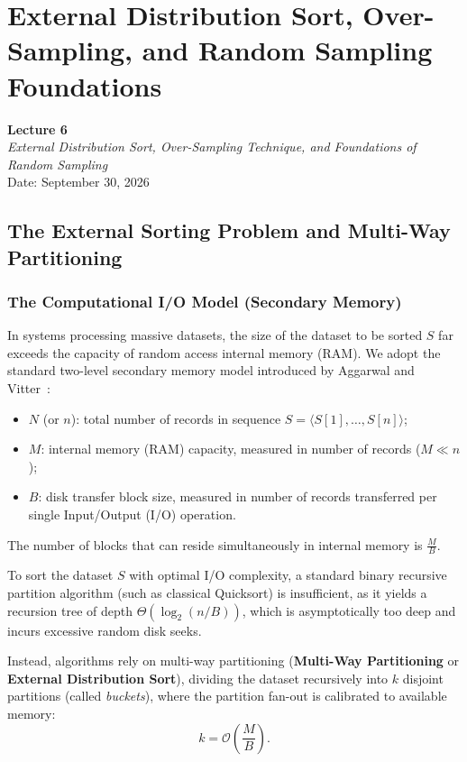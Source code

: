 \chapter{External Distribution Sort, Over-Sampling, and Random Sampling Foundations}
\label{chap:external-distribution-sort}

\begin{center}
  \textbf{Lecture 6}\\
  \emph{External Distribution Sort, Over-Sampling Technique, and Foundations of Random Sampling}\\[0.5em]
  Date: September 30, 2026
\end{center}

\section{The External Sorting Problem and Multi-Way Partitioning}
\label{sec:external-sorting-multiway}

\subsection{The Computational I/O Model (Secondary Memory)}
In systems processing massive datasets, the size of the dataset to be sorted $S$ far exceeds the capacity of random access internal memory (RAM). We adopt the standard two-level secondary memory model introduced by Aggarwal and Vitter~\cite{aggarwal1988}:
\begin{itemize}
  \item $N$ (or $n$): total number of records in sequence $S = \langle S[1], \dots, S[n] \rangle$;
  \item $M$: internal memory (RAM) capacity, measured in number of records ($M \ll n$);
  \item $B$: disk transfer block size, measured in number of records transferred per single Input/Output (I/O) operation.
\end{itemize}

The number of blocks that can reside simultaneously in internal memory is $\frac{M}{B}$.

To sort the dataset $S$ with optimal I/O complexity, a standard binary recursive partition algorithm (such as classical Quicksort) is insufficient, as it yields a recursion tree of depth $\Theta(\log_2(n/B))$, which is asymptotically too deep and incurs excessive random disk seeks.

Instead, algorithms rely on multi-way partitioning (\textbf{Multi-Way Partitioning} or \textbf{External Distribution Sort}), dividing the dataset recursively into $k$ disjoint partitions (called \textit{buckets}), where the partition fan-out is calibrated to available memory:
\begin{equation}
  k = \mathcal{O}\left(\frac{M}{B}\right).
\end{equation}

